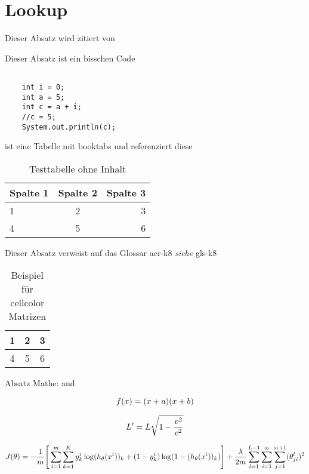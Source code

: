 \chapter{Lookup}
\blindtext

Dieser Absatz wird zitiert von \citep{TheOpenContainerEssentialsVideoCollection}

Dieser Absatz ist ein bisschen Code
\lstset{language=java, caption=Deklarieren von Variablen in Java }
\begin{lstlisting}

	int i = 0;
	int a = 5;
	int c = a + i;
	//c = 5;
	System.out.println(c);
\end{lstlisting}

\blindtext

 ist eine Tabelle mit booktabs und referenziert diese \\
\begin{table}[h]
	\begin{center}
		\begin{tabular}{lcr}
			\toprule
			Spalte 1 & Spalte 2 & Spalte 3 \\
			\midrule
			1 & 2 & 3 \\
			4 & 5 & 6 \\
			\bottomrule
		\end{tabular}
	\end{center}
	\caption{Testtabelle ohne Inhalt}
	\label{tab:Testtable}
\end{table}

Dieser Absatz verweist auf das Glossar
\gls{acr-k8} \emph{siehe} \gls{gls-k8}

\begin{table}[h]
	\begin{center}
		\begin{tabular}{|c|c|c|}
			\hline 
			\cellcolor{green} 1 & \cellcolor{red} 2 & \cellcolor{yellow} 3\\
			\hline 
			\cellcolor{red} 4 & \cellcolor{yellow} 5 & \cellcolor{green} 6\\
			\hline
		\end{tabular}
	\end{center}
\caption{Beispiel für cellcolor Matrizen}
\label{tab:comparisonMatrix}
\end{table}

Absatz Mathe:  and 

\begin{equation}
\label{eq:simple}
	\centering
	f(x) = (x+a)(x+b)	
\end{equation}

\begin{equation}
\label{eq:harder}
\centering
	L' = {L}{\sqrt{1-\frac{v^2}{c^2}}}
\end{equation}

\begin{equation}
	\centering
	J(\theta) = - \frac{1}{m} \Bigg[ \sum_{i=1}^{m}\sum_{k=1}^{K}y_k^i \log(h_{\theta}(x^i))_k + (1-y_k^i)\log(1-(h_{\theta}(x^i))_k) \Bigg] + \frac{\lambda}{2m}\sum_{l=1}^{L-1}\sum_{i=1}^{s_l}\sum_{j=1}^{s_l+1}(\theta_{ji}^l)^2
\end{equation}



